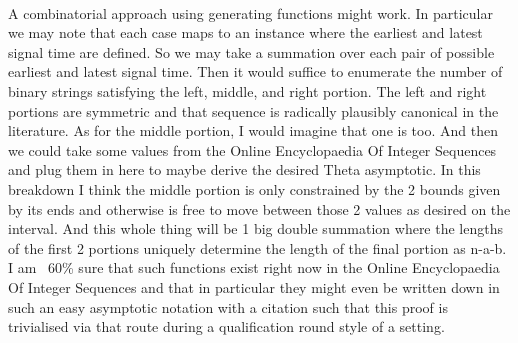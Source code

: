  \\
A combinatorial approach using generating functions might work. In particular we may note that each case maps to an instance where the earliest and latest signal time are defined. So we may take a summation over each pair of possible earliest and latest signal time. Then it would suffice to enumerate the number of binary strings satisfying the left, middle, and right portion. The left and right portions are symmetric and that sequence is radically plausibly canonical in the literature. As for the middle portion, I would imagine that one is too. And then we could take some values from the Online Encyclopaedia Of Integer Sequences and plug them in here to maybe derive the desired Theta asymptotic. In this breakdown I think the middle portion is only constrained by the 2 bounds given by its ends and otherwise is free to move between those 2 values as desired on the interval. And this whole thing will be 1 big double summation where the lengths of the first 2 portions uniquely determine the length of the final portion as n-a-b. I am ~60\% sure that such functions exist right now in the Online Encyclopaedia Of Integer Sequences and that in particular they might even be written down in such an easy asymptotic notation with a citation such that this proof is trivialised via that route during a qualification round style of a setting.


